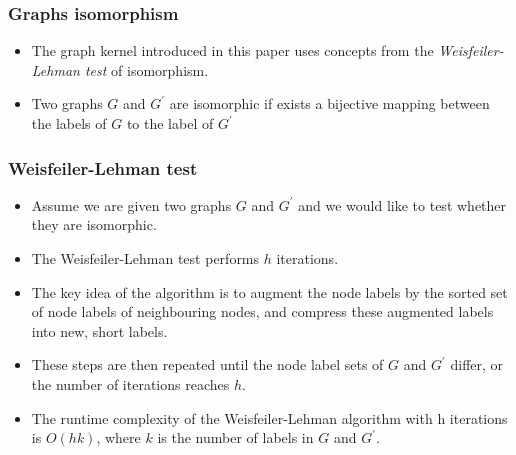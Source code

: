 \documentclass{beamer}
\begin{document}

\begin{frame}
\frametitle{Graphs isomorphism}

\begin{itemize}
\item
The graph kernel introduced in this paper uses concepts from the \textit{Weisfeiler-Lehman test} of isomorphism.

\item
Two graphs $G$ and $G^\prime$ are isomorphic if exists a bijective mapping between the labels of $G$ to the label of $G^\prime$
\end{itemize}

\end{frame}


\begin{frame}
\frametitle{Weisfeiler-Lehman test}

\begin{itemize}
\item
Assume we are given two graphs $G$ and $G^\prime$ and we would like to test whether they are isomorphic.
\item
The Weisfeiler-Lehman test performs $h$ iterations.
\item
The key idea of the algorithm is to augment the node labels by the sorted set of node labels of neighbouring nodes, and compress these augmented labels into new, short labels.
\item
These steps are then repeated until the node label sets of $G$ and $G^\prime$ differ, or the number of iterations reaches $h$.
\item
The runtime complexity of the Weisfeiler-Lehman algorithm with h iterations is $O(hk)$, where $k$ is the number of labels in $G$ and $G^\prime$.
\end{itemize}

\end{frame}

\end{document}
